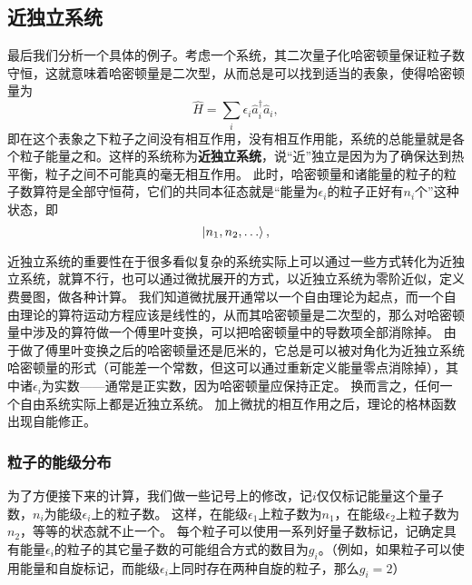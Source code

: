 \documentclass[hyperref, UTF8, a4paper]{ctexart}
\begin{document}
\subsection{近独立系统}

最后我们分析一个具体的例子。考虑一个系统，其二次量子化哈密顿量保证粒子数守恒，这就意味着哈密顿量是二次型，从而总是可以找到适当的表象，使得哈密顿量为
\begin{equation}
    \hat{H} = \sum_i \epsilon_i \hat{a}_i^\dagger \hat{a}_i,
\end{equation}
即在这个表象之下粒子之间没有相互作用，没有相互作用能，系统的总能量就是各个粒子能量之和。这样的系统称为\textbf{近独立系统}，说“近”独立是因为为了确保达到热平衡，粒子之间不可能真的毫无相互作用。
此时，哈密顿量和诸能量的粒子的粒子数算符是全部守恒荷，它们的共同本征态就是“能量为$\epsilon_i$的粒子正好有$n_i$个”这种状态，即
\[
    \ket{n_1, n_2, \ldots},
\]

近独立系统的重要性在于很多看似复杂的系统实际上可以通过一些方式转化为近独立系统，就算不行，也可以通过微扰展开的方式，以近独立系统为零阶近似，定义费曼图，做各种计算。
我们知道微扰展开通常以一个自由理论为起点，而一个自由理论的算符运动方程应该是线性的，从而其哈密顿量是二次型的，那么对哈密顿量中涉及的算符做一个傅里叶变换，可以把哈密顿量中的导数项全部消除掉。
由于做了傅里叶变换之后的哈密顿量还是厄米的，它总是可以被对角化为近独立系统哈密顿量的形式（可能差一个常数，但这可以通过重新定义能量零点消除掉），其中诸$\epsilon_i$为实数——通常是正实数，因为哈密顿量应保持正定。
换而言之，任何一个自由系统实际上都是近独立系统。
加上微扰的相互作用之后，理论的格林函数出现自能修正。

\subsubsection{粒子的能级分布}

为了方便接下来的计算，我们做一些记号上的修改，记$i$仅仅标记能量这个量子数，$n_i$为能级$\epsilon_i$上的粒子数。
这样，在能级$\epsilon_1$上粒子数为$n_1$，在能级$\epsilon_2$上粒子数为$n_2$，等等的状态就不止一个。
每个粒子可以使用一系列好量子数标记，记确定具有能量$\epsilon_i$的粒子的其它量子数的可能组合方式的数目为$g_i$。（例如，如果粒子可以使用能量和自旋标记，而能级$\epsilon_i$上同时存在两种自旋的粒子，那么$g_i=2$）
\end{document}
